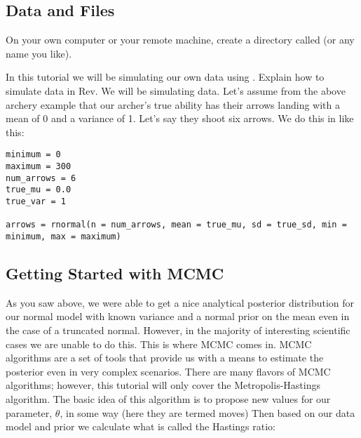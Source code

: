 \medskip
\subsection{Data and Files}\label{subsect:Exercise-DataFiles}

{\begin{framed}
On your own computer or your remote machine, create a directory called {\textcolor{red}{}} (or any name you like).

\end{framed}}

In this tutorial we will be simulating our own data using \RevBayes. Explain how to simulate data in Rev. We will be simulating data. Let's assume from the above archery example that our archer's true ability has their arrows landing with a mean of 0 and a variance of 1. Let's say they shoot six arrows. We do this in \RevBayes like this:

 {\tt \begin{snugshade*}
\begin{lstlisting}
minimum = 0
maximum = 300
num_arrows = 6
true_mu = 0.0
true_var = 1

arrows = rnormal(n = num_arrows, mean = true_mu, sd = true_sd, min = minimum, max = maximum)

\end{lstlisting}
\end{snugshade*}}



\bigskip
\subsection{Getting Started with MCMC\label{subsect:Exercise-GetStart}}

As you saw above, we were able to get a nice analytical posterior distribution for our normal model with known variance and a normal prior on the mean even in the case of a truncated normal. However, in the majority of interesting scientific cases we are unable to do this. This is where MCMC comes in. MCMC algorithms are a set of tools that provide us with a means to estimate the posterior even in very complex scenarios. There are many flavors of MCMC algorithms; however, this tutorial will only cover the Metropolis-Hastings algorithm. The basic idea of this algorithm is to propose new values for our parameter, $\theta$, in some way (here they are termed moves) Then based on our data model and prior we calculate what is called the Hastings ratio:

